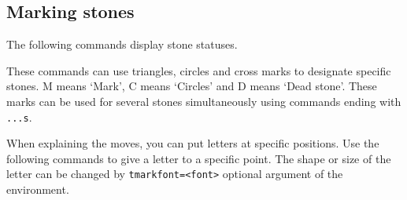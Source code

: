 \documentclass[a4paper]{oblivoir}
\begin{document}
\begin{ksbadukpan}[badukpansize=7,badukpancolor=yellow!20][DL]
\end{ksbadukpan}

\subsection{Marking stones
}

The following commands display stone statuses.

\begin{boxedverbatim}
   
  
  
\end{boxedverbatim}

\begin{ksbadukpan}[badukpansize=7,badukpancolor=yellow!20][DL]
   
  
  
\end{ksbadukpan}

These commands can use triangles, circles and cross marks to designate specific stones.
M means `Mark', C means `Circles' and D means `Dead stone'.
These marks can be used for several stones simultaneously using commands ending with \verb|...s|. 

When explaining the moves, you can put letters at specific positions. 
Use the following commands to give a letter to a specific point.
The shape or size of the letter can be changed by \texttt{tmarkfont=<font>} optional argument of the environment.

\begin{boxedverbatim}
 
\end{boxedverbatim}

\begin{boxedverbatim}
\begin{ksbadukpan}[tmarkfont={\bfseries\sffamily}][DL]
 
\end{ksbadukpan}
\end{boxedverbatim}

\begin{ksbadukpan}[badukpansize=7,badukpancolor=yellow!20,][DL]
 
\end{ksbadukpan}
\quad
\begin{ksbadukpan}[badukpansize=7,badukpancolor=yellow!20,tmarkfont={\bfseries\sffamily}][DL]
 
\end{ksbadukpan}
\end{document}
